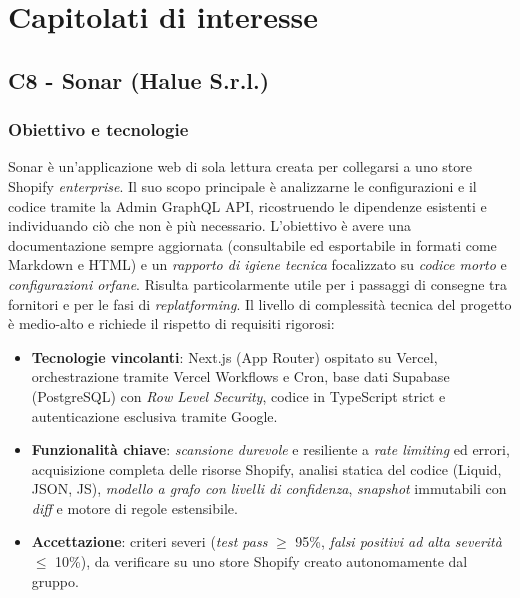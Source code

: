 \documentclass[11pt, a4paper]{article}
\begin{document}
\section{Capitolati di interesse}

\subsection{C8 - Sonar (Halue S.r.l.)}
\subsubsection{Obiettivo e tecnologie}
Sonar è un'applicazione web di sola lettura creata per collegarsi a uno store Shopify \textit{enterprise}. Il suo scopo principale è analizzarne le configurazioni e il codice tramite la Admin GraphQL API, ricostruendo le dipendenze esistenti e individuando ciò che non è più necessario. L'obiettivo è avere una documentazione sempre aggiornata (consultabile ed esportabile in formati come Markdown e HTML) e un \textit{rapporto di igiene tecnica} focalizzato su \textit{codice morto} e \textit{configurazioni orfane}. Risulta particolarmente utile per i passaggi di consegne tra fornitori e per le fasi di \textit{replatforming}. \newline
Il livello di complessità tecnica del progetto è medio-alto e richiede il rispetto di requisiti rigorosi:

\begin{itemize}
    \item \textbf{Tecnologie vincolanti}: Next.js (App Router) ospitato su Vercel, orchestrazione tramite Vercel Workflows e Cron, base dati Supabase (PostgreSQL) con \textit{Row Level Security}, codice in TypeScript strict e autenticazione esclusiva tramite Google.
    \item \textbf{Funzionalità chiave}: \textit{scansione durevole} e resiliente a \textit{rate limiting} ed errori, acquisizione completa delle risorse Shopify, analisi statica del codice (Liquid, JSON, JS), \textit{modello a grafo con livelli di confidenza}, \textit{snapshot} immutabili con \textit{diff} e motore di regole estensibile.
    \item \textbf{Accettazione}: criteri severi (\textit{test pass} $\ge$ 95\%, \textit{falsi positivi ad alta severità} $\le$ 10\%), da verificare su uno store Shopify creato autonomamente dal gruppo.
\end{itemize}
\end{document}
